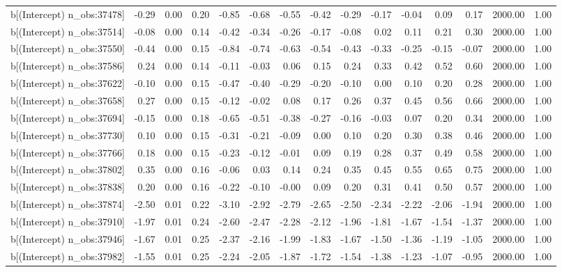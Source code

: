 \begin{table}[ht]
\begin{tabular}{rrrrrrrrrrrrrrr}
  b[(Intercept) n\_obs:37478] & -0.29 & 0.00 & 0.20 & -0.85 & -0.68 & -0.55 & -0.42 & -0.29 & -0.17 & -0.04 & 0.09 & 0.17 & 2000.00 & 1.00 \\ 
  b[(Intercept) n\_obs:37514] & -0.08 & 0.00 & 0.14 & -0.42 & -0.34 & -0.26 & -0.17 & -0.08 & 0.02 & 0.11 & 0.21 & 0.30 & 2000.00 & 1.00 \\ 
  b[(Intercept) n\_obs:37550] & -0.44 & 0.00 & 0.15 & -0.84 & -0.74 & -0.63 & -0.54 & -0.43 & -0.33 & -0.25 & -0.15 & -0.07 & 2000.00 & 1.00 \\ 
  b[(Intercept) n\_obs:37586] & 0.24 & 0.00 & 0.14 & -0.11 & -0.03 & 0.06 & 0.15 & 0.24 & 0.33 & 0.42 & 0.52 & 0.60 & 2000.00 & 1.00 \\ 
  b[(Intercept) n\_obs:37622] & -0.10 & 0.00 & 0.15 & -0.47 & -0.40 & -0.29 & -0.20 & -0.10 & 0.00 & 0.10 & 0.20 & 0.28 & 2000.00 & 1.00 \\ 
  b[(Intercept) n\_obs:37658] & 0.27 & 0.00 & 0.15 & -0.12 & -0.02 & 0.08 & 0.17 & 0.26 & 0.37 & 0.45 & 0.56 & 0.66 & 2000.00 & 1.00 \\ 
  b[(Intercept) n\_obs:37694] & -0.15 & 0.00 & 0.18 & -0.65 & -0.51 & -0.38 & -0.27 & -0.16 & -0.03 & 0.07 & 0.20 & 0.34 & 2000.00 & 1.00 \\ 
  b[(Intercept) n\_obs:37730] & 0.10 & 0.00 & 0.15 & -0.31 & -0.21 & -0.09 & 0.00 & 0.10 & 0.20 & 0.30 & 0.38 & 0.46 & 2000.00 & 1.00 \\ 
  b[(Intercept) n\_obs:37766] & 0.18 & 0.00 & 0.15 & -0.23 & -0.12 & -0.01 & 0.09 & 0.19 & 0.28 & 0.37 & 0.49 & 0.58 & 2000.00 & 1.00 \\ 
  b[(Intercept) n\_obs:37802] & 0.35 & 0.00 & 0.16 & -0.06 & 0.03 & 0.14 & 0.24 & 0.35 & 0.45 & 0.55 & 0.65 & 0.75 & 2000.00 & 1.00 \\ 
  b[(Intercept) n\_obs:37838] & 0.20 & 0.00 & 0.16 & -0.22 & -0.10 & -0.00 & 0.09 & 0.20 & 0.31 & 0.41 & 0.50 & 0.57 & 2000.00 & 1.00 \\ 
  b[(Intercept) n\_obs:37874] & -2.50 & 0.01 & 0.22 & -3.10 & -2.92 & -2.79 & -2.65 & -2.50 & -2.34 & -2.22 & -2.06 & -1.94 & 2000.00 & 1.00 \\ 
  b[(Intercept) n\_obs:37910] & -1.97 & 0.01 & 0.24 & -2.60 & -2.47 & -2.28 & -2.12 & -1.96 & -1.81 & -1.67 & -1.54 & -1.37 & 2000.00 & 1.00 \\ 
  b[(Intercept) n\_obs:37946] & -1.67 & 0.01 & 0.25 & -2.37 & -2.16 & -1.99 & -1.83 & -1.67 & -1.50 & -1.36 & -1.19 & -1.05 & 2000.00 & 1.00 \\ 
  b[(Intercept) n\_obs:37982] & -1.55 & 0.01 & 0.25 & -2.24 & -2.05 & -1.87 & -1.72 & -1.54 & -1.38 & -1.23 & -1.07 & -0.95 & 2000.00 & 1.00 \\ 

\end{tabular}
\end{table}
